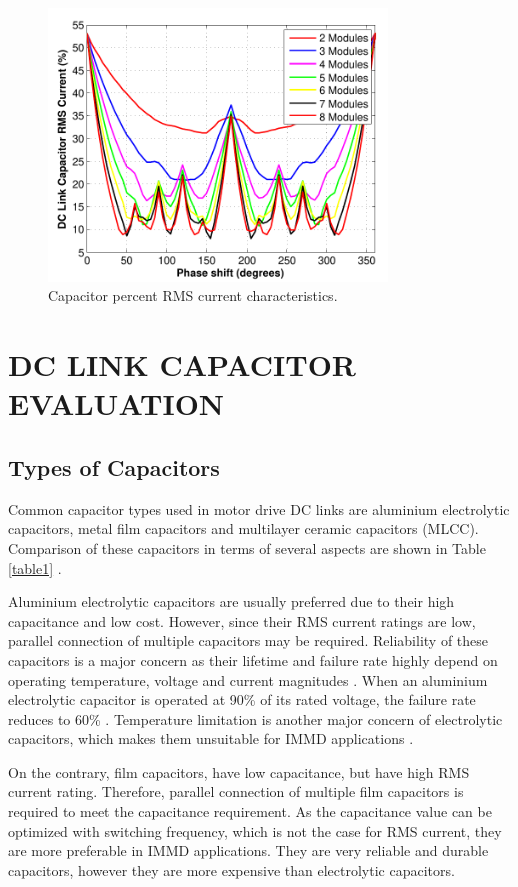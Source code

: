 \documentclass[conference,a4paper,twocolumn]{IEEEtran}
\begin{document}
\begin{figure}[h]
  \centering
  \includegraphics[width=9cm]{fig5_2}
  \caption{Capacitor percent RMS current characteristics.}
  \label{fig5}
\end{figure}



\section{DC LINK CAPACITOR EVALUATION}

\subsection{Types of Capacitors}


Common capacitor types used in motor drive DC links are aluminium electrolytic capacitors, metal film capacitors and multilayer ceramic capacitors (MLCC). Comparison of these capacitors in terms of several aspects are shown in Table \ref{table1} \cite{LoCalzo2016,Lambert2015a,Wang2013,Wang2015b,Brown2007}.

Aluminium electrolytic capacitors are usually preferred due to their high capacitance and low cost. However, since their RMS current ratings are low, parallel connection of multiple capacitors may be required. Reliability of these capacitors is a major concern as their lifetime and failure rate highly depend on operating temperature, voltage and current magnitudes \cite{Su2010}. When an aluminium electrolytic capacitor is operated at 90\% of its rated voltage, the failure rate reduces to 60\% \cite{Bianchi2003}. Temperature limitation is another major concern of electrolytic capacitors, which makes them unsuitable for IMMD applications \cite{Brown2007}.

On the contrary, film capacitors, have low capacitance, but have high RMS current rating. Therefore, parallel connection of multiple film capacitors is required to meet the capacitance requirement. As the capacitance value can be optimized with switching frequency, which is not the case for RMS current, they are more preferable in IMMD applications. They are very reliable and durable capacitors, however they are more expensive than electrolytic capacitors.
\end{document}
